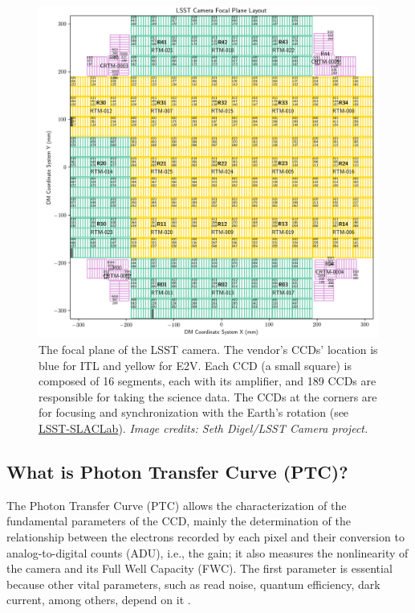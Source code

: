 \begin{figure}[!htb]
    \centering
    \includegraphics[width=\textwidth]{Figures/FP_layout_DM.png}
    \caption{The focal plane of the LSST camera. The vendor's CCDs' location is blue for ITL and yellow for E2V. Each CCD (a small square) is composed of 16 segments, each with its amplifier, and 189 CCDs are responsible for taking the science data. The CCDs at the corners are for focusing and synchronization with the Earth's rotation (see \href{https://www6.slac.stanford.edu/news/2020-09-08-sensors-world-largest-digital-camera-snap-first-3200-megapixel-images-slac.aspx}{LSST-SLACLab}). \textit{Image credits: Seth Digel/LSST Camera project.}}
    \label{fig:FP_LSSTCam}
\end{figure}

\subsection{What is Photon Transfer Curve (PTC)?}

The Photon Transfer Curve (PTC) allows the characterization of the fundamental parameters of the CCD, mainly the determination of the relationship between the electrons recorded by each pixel and their conversion to analog-to-digital counts (ADU), i.e., the gain; it also measures the nonlinearity of the camera and its Full Well Capacity (FWC). The first parameter is essential because other vital parameters, such as read noise, quantum efficiency, dark current, among others, depend on it \citep{downing2006ccd}.

